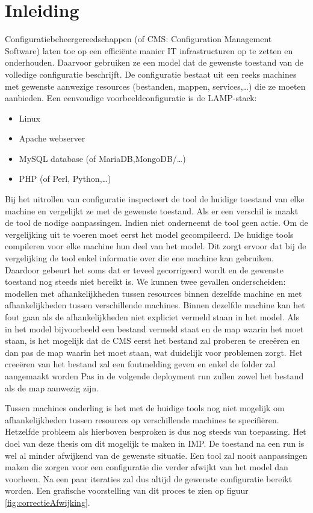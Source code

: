\chapter{Inleiding}
\label{inleiding}
Configuratiebeheergereedschappen (of CMS: Configuration Management Software) laten toe op een effici\"ente manier IT infrastructuren op te zetten en onderhouden.
Daarvoor gebruiken ze een model dat de gewenste toestand van de volledige configuratie beschrijft.
De configuratie bestaat uit een reeks machines met gewenste aanwezige resources (bestanden, mappen, services,\ldots) die ze moeten aanbieden.
Een eenvoudige voorbeeldconfiguratie is de LAMP-stack: 
\begin{itemize}
  \item Linux
  \item Apache webserver
  \item MySQL database (of MariaDB,MongoDB/\ldots)
  \item PHP (of Perl, Python,\ldots)
\end{itemize}

Bij het uitrollen van configuratie inspecteert de tool de huidige toestand van elke machine en vergelijkt ze met de gewenste toestand.
Als er een verschil is maakt de tool de nodige aanpassingen. Indien niet onderneemt de tool geen actie.
Om de vergelijking uit te voeren moet eerst het model gecompileerd.
De huidige tools compileren voor elke machine hun deel van het model.
Dit zorgt ervoor dat bij de vergelijking de tool enkel informatie over die ene machine kan gebruiken.
Daardoor gebeurt het soms dat er teveel gecorrigeerd wordt en de gewenste toestand nog steeds niet bereikt is.
We kunnen twee gevallen onderscheiden: modellen met afhankelijkheden tussen resources binnen dezelfde machine en met afhankelijkheden tussen verschillende machines.
Binnen dezelfde machine kan het fout gaan als de afhankelijkheden niet expliciet vermeld staan in het model. 
Als in het model bijvoorbeeld een bestand vermeld staat en de map waarin het moet staan, is het mogelijk dat de CMS eerst het bestand zal
proberen te cree\"eren en dan pas de map waarin het moet staan, wat duidelijk voor problemen zorgt.
Het cree\"eren van het bestand zal een foutmelding geven en enkel de folder zal aangemaakt worden
Pas in de volgende deployment run zullen zowel het bestand als de map aanwezig zijn.

Tussen machines onderling is het met de huidige tools nog niet mogelijk om afhankelijkheden tussen resources op verschillende machines te
specifi\"eren. 
Hetzelfde probleem als hierboven besproken is dus nog steeds van toepassing. 
Het doel van deze thesis om dit mogelijk te maken in IMP.
De toestand na een run is wel al minder afwijkend van de gewenste situatie.
Een tool zal nooit aanpassingen maken die zorgen voor een configuratie die verder afwijkt van het model dan voorheen.
Na een paar iteraties zal dus altijd de gewenste configuratie bereikt worden.
Een grafische voorstelling van dit proces te zien op figuur \ref{fig:correctieAfwijking}.

